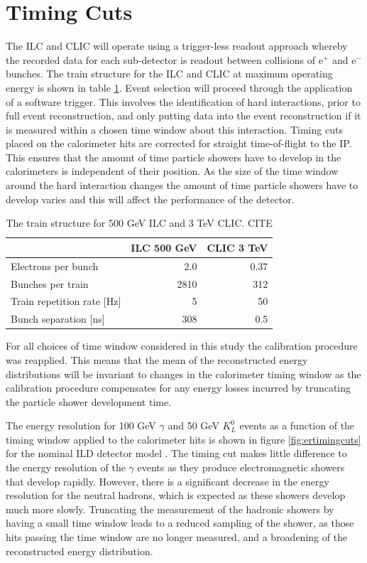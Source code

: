 \section{Timing Cuts}
The ILC and CLIC will operate using a trigger-less readout approach whereby the recorded data for each sub-detector is readout between collisions of $\text{e}^{+}$ and $\text{e}^{-}$ bunches.  The train structure for the ILC and CLIC at maximum operating energy is shown in table \ref{table:trainstructure}.  Event selection will proceed through the application of a software trigger.  This involves the identification of hard interactions, prior to full event reconstruction, and only putting data into the event reconstruction if it is measured within a chosen time window about this interaction.  Timing cuts placed on the calorimeter hits are corrected for straight time-of-flight to the IP.  This ensures that the amount of time particle showers have to develop in the calorimeters is independent of their position.  As the size of the time window around the hard interaction changes the amount of time particle showers have to develop varies and this will affect the performance of the detector. 

\begin{table}[h!]
\centering
\begin{tabular}{l r r}
\hline
& ILC 500 GeV & CLIC 3 TeV \\
\hline
Electrons per bunch & 2.0 & 0.37 \\
Bunches per train & 2810 & 312 \\
Train repetition rate [Hz] & 5 & 50 \\
Bunch separation [ns] & 308 & 0.5 \\
\end{tabular}
\caption[The train structure for 500 GeV ILC and 3 TeV CLIC.]{The train structure for 500 GeV ILC and 3 TeV CLIC.  CITE}
\label{table:trainstructure}
\end{table}

For all choices of time window considered in this study the calibration procedure was reapplied.  This means that the mean of the reconstructed energy distributions will be invariant to changes in the calorimeter timing window as the calibration procedure compensates for any energy losses incurred by truncating the particle shower development time.  

The energy resolution for 100 GeV $\gamma$ and 50 GeV $K^{0}_{L}$ events as a function of the timing window applied to the calorimeter hits is shown in figure \ref{fig:ertimingcuts} for the nominal ILD detector model .  The timing cut makes little difference to the energy resolution of the $\gamma$ events as they produce electromagnetic showers that develop rapidly.  However, there is a significant decrease in the energy resolution for the neutral hadrons, which is expected as these showers develop much more slowly.  Truncating the measurement of the hadronic showers by having a small time window leads to a reduced sampling of the shower, as those hits passing the time window are no longer measured, and a broadening of the reconstructed energy distribution.  

